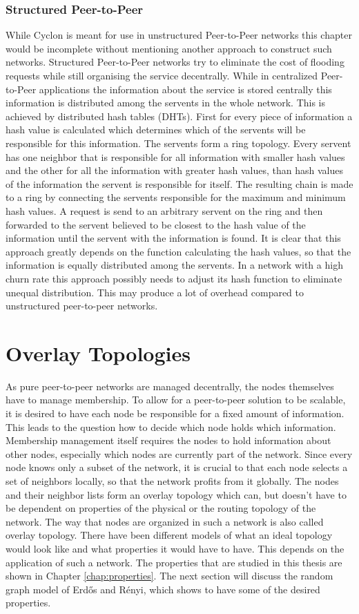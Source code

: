 \subsubsection{Structured Peer-to-Peer}
While Cyclon is meant for use in unstructured Peer-to-Peer networks this chapter
would be incomplete without mentioning another approach to construct such
networks. Structured Peer-to-Peer networks try to eliminate the cost of
flooding requests while still organising the service decentrally. While in
centralized Peer-to-Peer applications the information about the service is
stored centrally this information is distributed among the servents in the whole
network. This is achieved by distributed hash tables (DHTs). First for every
piece of information a hash value is calculated which determines which of the
servents will be responsible for this information. The servents form a ring
topology. Every servent has one neighbor that is responsible for all
information with smaller hash values and the other for all the information with greater hash
values, than hash values of the information the servent is responsible for
itself. The resulting chain is made to a ring by connecting the servents
responsible for the maximum and minimum hash values. A request is send to an
arbitrary servent on the ring and then forwarded to the servent believed to be
closest to the hash value of the information until the servent with the
information is found. It is clear that this approach greatly depends on the
function calculating the hash values, so that the information is equally distributed
among the servents. In a network with a high churn rate this approach possibly
needs to adjust its hash function to eliminate unequal distribution. This may
produce a lot of overhead compared to unstructured peer-to-peer networks.


\section{Overlay Topologies}
As pure peer-to-peer networks are managed decentrally,
the nodes themselves have to manage membership. To allow for a peer-to-peer
solution to be scalable, it is desired to have each node be responsible for a
fixed amount of information. This leads to the question how to decide which node
holds which information. Membership management itself requires the nodes to
hold information about other nodes, especially which nodes are currently part of the
network. Since every node knows only a subset of the network, it is crucial to
that each node selects a set of neighbors locally, so that the network profits
from it globally. The nodes and their neighbor lists form an overlay topology
which can, but doesn't have to be dependent on properties of the physical or
the routing topology of the network. The way that nodes are organized in such a
network is also called overlay topology. There have been different models of
what an ideal topology would look like and what properties it would have to
have. This depends on the application of such a network. The properties that are
studied in this thesis are shown in Chapter \ref{chap:properties}. The next
section will discuss the random graph model of Erd\H{o}s and R\'{e}nyi, which
shows to have some of the desired properties.
